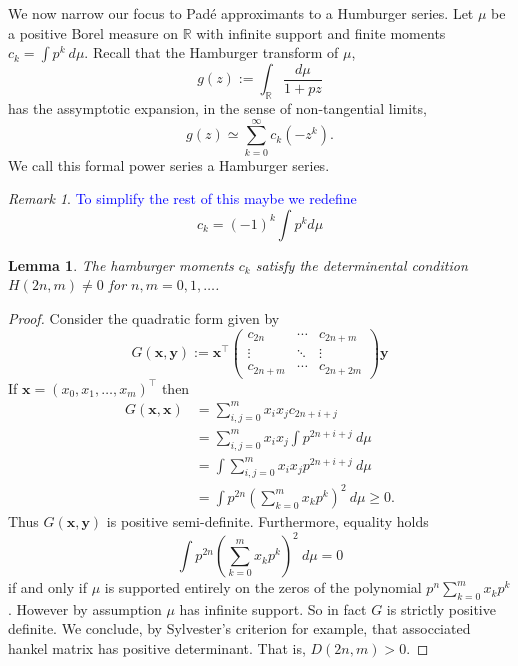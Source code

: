 \documentclass{amsart}
\newtheorem{lemma}[theorem]{Lemma}
\theoremstyle{remark}
\newtheorem{remark}[theorem]{Remark}
\numberwithin{equation}{section}
\newcommand{\tc}{\textcolor{blue}}
\newcommand{\RR}{\mathbb{R}}
\begin{document}
We now narrow our focus to Pad\'e approximants to a Humburger series. Let $\mu$ be a positive Borel measure on $\RR$ with infinite support and finite moments $c_k = \int p^k ~d\mu$. Recall that the Hamburger transform of $\mu$,
\[
    g(z) := \int_\RR \frac{d\mu}{1+pz}
\]
has the assymptotic expansion, in the sense of non-tangential limits,
\[
    g(z) \simeq \sum_{k=0}^\infty c_k (-z^k).
\]
We call this formal power series a Hamburger series. 

\begin{remark}
    \tc{To simplify the rest of this maybe we redefine}
    \[
        c_k = (-1)^k\int p^k d\mu
    \]
\end{remark}

\begin{lemma}
    The hamburger moments $c_k$ satisfy the determinental condition $H(2n, m) \neq 0$ for $n,m = 0, 1, \ldots$. 
\end{lemma}
\begin{proof}
    Consider the quadratic form given by
    \[
        G(\mathbf{x}, \mathbf{y}) := 
        \mathbf{x}^\top
        \begin{pmatrix}
            c_{2n} & \cdots & c_{2n+m} \\
            \vdots & \ddots & \vdots  \\
            c_{2n+m} & \cdots & c_{2n+2m}
        \end{pmatrix}
        \mathbf{y}
    \]
    If $\mathbf{x} = (x_0, x_1, \ldots, x_m)^\top$ then
    \begin{align*}
        G(\mathbf{x}, \mathbf{x})
        &= \sum_{i,j=0}^m x_ix_jc_{2n+i+j} \\
        &= \sum_{i,j=0}^m x_ix_j \int p^{2n+i+j} ~d\mu \\
        &= \int \sum_{i,j=0}^m x_ix_jp^{2n+i+j} ~d\mu \\
        &= \int p^{2n}\left(\sum_{k=0}^m x_kp^{k}\right)^2 ~d\mu \geq 0.
    \end{align*}
    Thus $G(\mathbf{x}, \mathbf{y})$ is positive semi-definite. Furthermore, equality holds
    \[
        \int p^{2n}\left(\sum_{k=0}^m x_kp^{k}\right)^2 ~d\mu = 0
    \]
    if and only if $\mu$ is supported entirely on the zeros of the polynomial $p^n\sum_{k=0}^m x_kp^{k}$. However by assumption $\mu$ has infinite support. So in fact $G$ is strictly positive definite. We conclude, by Sylvester's criterion for example, that assocciated hankel matrix has positive determinant. That is, $D(2n, m) > 0$.
\end{proof}
\end{document}
